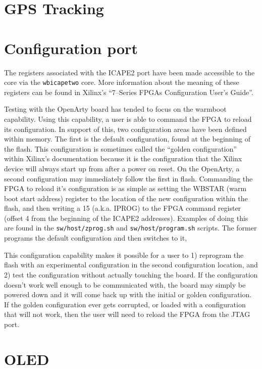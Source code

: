 \documentclass{gqtekspec}
\begin{document}
\section{GPS Tracking}
\section{Configuration port}

The registers associated with the ICAPE2 port have been made accessible
to the core via the {\tt wbicapetwo} core.  More information about the meaning
of these registers can be found in Xilinx's ``7--Series FPGAs Configuration
User's Guide''.  

Testing with the OpenArty board has tended to focus on the warmboot capability.
Using this capability, a user is able to command the FPGA to reload its
configuration.  In support of this, two configuration areas have been 
defined within memory.  The first is the default configuration, found at
the beginning of the flash.  This configuration is sometimes called the ``golden
configuration'' within Xilinx's documentation because it is the configuration
that the Xilinx device will always start up from after a power on reset.  On
the OpenArty, a second configuration may immediately follow the first in flash. 
Commanding the FPGA to reload it's configuration is as simple as
setting the WBSTAR (warm boot start address) register to the location of the
new configuration within the flash, and then writing a 15 (a.k.a. IPROG)
to the FPGA command register (offset 4 from the beginning of the ICAPE2
addresses).  Examples of doing this are found in the 
{\tt sw/host/zprog.sh} and {\tt sw/host/program.sh} scripts.  The former
programs the default configuration and then switches to it, 

This configuration capability makes it possible for a user to 1) reprogram
the flash with an experimental configuration in the second configuration
location, and 2) test the configuration without actually touching the board. 
If the configuration doesn't work well enough to be communicated with, the
board may simply be powered down and it will come back up with the initial
or golden configuration.  If the golden configuration ever gets corrupted,
or loaded with a configuration that will not work, then the user will need to
reload the FPGA from the JTAG port.

\section{OLED}
\end{document}
